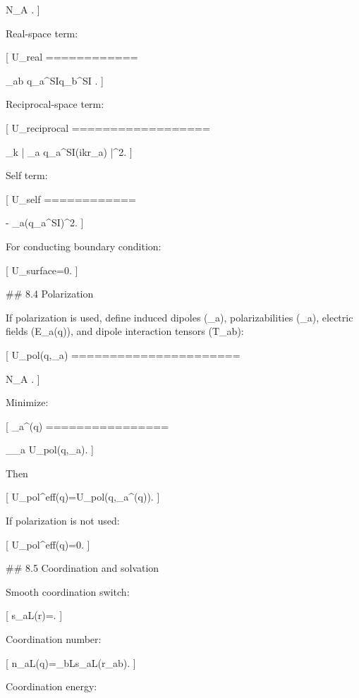 N_A
.
]

Real-space term:

[
U_{\rm real}
============

\sum_{a\ne b}
q_a^{\rm SI}q_b^{\rm SI}
.
]

Reciprocal-space term:

[
U_{\rm reciprocal}
==================

\sum_{k}
\left|
\sum_a q_a^{\rm SI}\exp(ik\cdot r_a)
\right|^2.
]

Self term:

[
U_{\rm self}
============

-\frac{\alpha}{\sqrt\pi}
\sum_a(q_a^{\rm SI})^2.
]

For conducting boundary condition:

[
U_{\rm surface}=0.
]

## 8.4 Polarization

If polarization is used, define induced dipoles (\mu_a), polarizabilities (\alpha_a), electric fields (E_a(q)), and dipole interaction tensors (T_{ab}):

[
U_{\rm pol}(q,{\mu_a})
======================

N_A
.
]

Minimize:

[
{\mu_a^\star(q)}
================

\arg\min_{{\mu_a}}
U_{\rm pol}(q,{\mu_a}).
]

Then

[
U_{\rm pol}^{\rm eff}(q)=U_{\rm pol}(q,{\mu_a^\star(q)}).
]

If polarization is not used:

[
U_{\rm pol}^{\rm eff}(q)=0.
]

## 8.5 Coordination and solvation

Smooth coordination switch:

[
s_{aL}(r)=.
]

Coordination number:

[
n_{aL}(q)=\sum_{b\in L}s_{aL}(r_{ab}).
]

Coordination energy:

